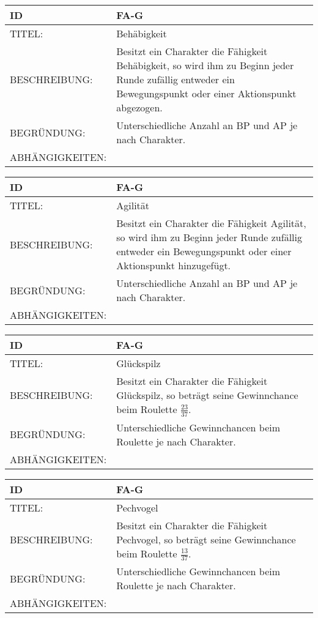 \begin{tabularx}{16cm}{l|X}
	{table}\label{Behaebigkeit}
	\textbf{ID} & \textbf{FA-G \arabic{table}} \\
	\hline
	TITEL: & Behäbigkeit \\
	\hline
	BESCHREIBUNG: & Besitzt ein Charakter die Fähigkeit Behäbigkeit, so wird ihm zu Beginn jeder Runde zufällig entweder ein Bewegungspunkt oder einer Aktionspunkt abgezogen.\\
	\hline
	BEGRÜNDUNG: & Unterschiedliche Anzahl an BP und AP je nach Charakter.\\
	\hline
	ABHÄNGIGKEITEN: & \\
\end{tabularx}

\begin{tabularx}{16cm}{l|X}
	{table}\label{Agilitaet}
	\textbf{ID} & \textbf{FA-G \arabic{table}} \\
	\hline
	TITEL: & Agilität \\
	\hline
	BESCHREIBUNG: & Besitzt ein Charakter die Fähigkeit Agilität, so wird ihm zu Beginn jeder Runde zufällig entweder ein Bewegungspunkt oder einer Aktionspunkt hinzugefügt.\\
	\hline
	BEGRÜNDUNG: & Unterschiedliche Anzahl an BP und AP je nach Charakter.\\
	\hline
	ABHÄNGIGKEITEN: & \\
\end{tabularx}

\begin{tabularx}{16cm}{l|X}
	{table}\label{Glueckspilz}
	\textbf{ID} & \textbf{FA-G \arabic{table}} \\
	\hline
	TITEL: & Glückspilz \\
	\hline
	BESCHREIBUNG: & Besitzt ein Charakter die Fähigkeit Glückspilz, so beträgt seine Gewinnchance beim Roulette $\frac{23}{37}$.\\
	\hline
	BEGRÜNDUNG: & Unterschiedliche Gewinnchancen beim Roulette je nach Charakter.\\
	\hline
	ABHÄNGIGKEITEN: & \\
\end{tabularx}

\begin{tabularx}{16cm}{l|X}
	{table}\label{Pechvogel}
	\textbf{ID} & \textbf{FA-G \arabic{table}} \\
	\hline
	TITEL: & Pechvogel \\
	\hline
	BESCHREIBUNG: & Besitzt ein Charakter die Fähigkeit Pechvogel, so beträgt seine Gewinnchance beim Roulette $\frac{13}{37}$.\\
	\hline
	BEGRÜNDUNG: & Unterschiedliche Gewinnchancen beim Roulette je nach Charakter. \\
	\hline
	ABHÄNGIGKEITEN: &\\
\end{tabularx}

